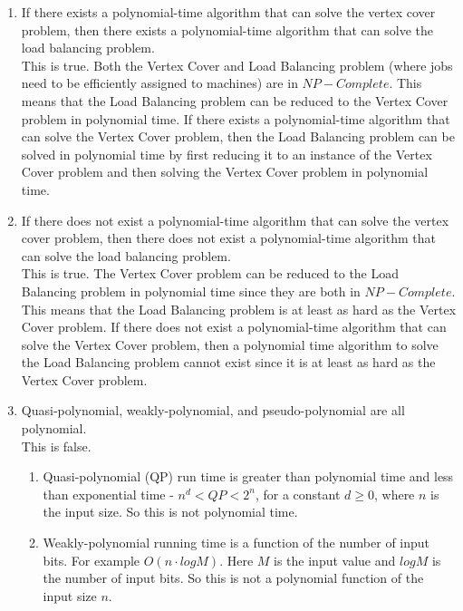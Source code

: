 \documentclass[paper=a4, fontsize=11pt]{scrartcl} %
\numberwithin{figure}{section} %
\numberwithin{table}{section} %
\begin{document}
\begin{enumerate}
\begin{enumerate}
\item If there exists a polynomial-time algorithm that can solve the vertex cover problem, then there exists a polynomial-time algorithm that can solve the load balancing problem.\\

This is true. Both the Vertex Cover and Load Balancing problem (where jobs need to be efficiently assigned to machines) are in $NP-Complete$. This means that the Load Balancing problem can be reduced to the Vertex Cover problem in polynomial time.  If there exists a polynomial-time algorithm that can solve the Vertex Cover problem, then the Load Balancing problem can be solved in polynomial time by first reducing it to an instance of the Vertex Cover problem and then solving the Vertex Cover problem in polynomial time.

\item If there does not exist a polynomial-time algorithm that can solve the vertex cover problem, then there does not exist a polynomial-time algorithm that can solve the load balancing problem.\\

This is true. The Vertex Cover problem can be reduced to the Load Balancing problem in polynomial time since they are both in $NP-Complete$. This means that the Load Balancing problem is at least as hard as the Vertex Cover problem. If there does not exist a polynomial-time algorithm that can solve the Vertex Cover problem, then a polynomial time algorithm to solve the Load Balancing problem cannot exist since it is at least as hard as the Vertex Cover problem.

\item Quasi-polynomial, weakly-polynomial, and pseudo-polynomial are all polynomial.\\

This is false.

\begin{enumerate}

\item Quasi-polynomial (QP) run time is greater than polynomial time and less than exponential time - $n^d < QP < 2^n$, for a constant $d \geq 0$, where $n$ is the input size. So this is not polynomial time.

\item Weakly-polynomial running time is a function of the number of input bits. For example $O(n \cdot log M)$. Here $M$ is the input value and $log M$ is the number of input bits. So this is not a polynomial function of the input size $n$.


\end{enumerate}
\end{enumerate}
\end{enumerate}
\end{document}

